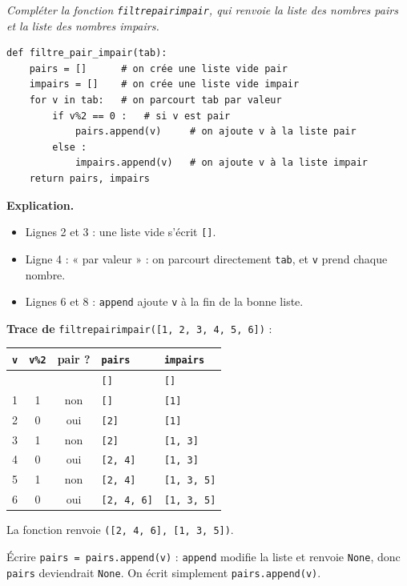 \documentclass[addpoints, 11pt]{exam}
\newcommand{\enonce}[1]{\textit{#1}\par\smallskip}
\newcommand{\explication}{\par\smallskip\noindent\textbf{Explication.}\ }
\newcommand{\code}[1]{\texttt{#1}}
\DeclareRobustCommand{\_}{\textunderscore\allowbreak}
\begin{document}
\begin{questions}
\question[3] \enonce{Compléter la fonction \code{filtre\_pair\_impair}, qui renvoie la liste des nombres pairs et la liste des nombres impairs.}
\begin{reponse}
\begin{lstlisting}
def filtre_pair_impair(tab):
    pairs = []      # on crée une liste vide pair
    impairs = []    # on crée une liste vide impair
    for v in tab:   # on parcourt tab par valeur
        if v%2 == 0 :   # si v est pair
            pairs.append(v)     # on ajoute v à la liste pair
        else :
            impairs.append(v)   # on ajoute v à la liste impair
    return pairs, impairs
\end{lstlisting}
\end{reponse}
\explication
\begin{itemize}
  \item Lignes 2 et 3 : une liste vide s'écrit \code{[]}.
  \item Ligne 4 : « par valeur » : on parcourt directement \code{tab}, et \code{v} prend chaque nombre.
  \item Lignes 6 et 8 : \code{append} ajoute \code{v} à la fin de la bonne liste.
\end{itemize}
\textbf{Trace de} \code{filtre\_pair\_impair([1, 2, 3, 4, 5, 6])} :
\begin{center}
\begin{tabular}{|c|c|c|l|l|}
\hline
\code{v} & \code{v\%2} & pair ? & \code{pairs} & \code{impairs} \\ \hline
& & & \code{[]} & \code{[]} \\
1 & 1 & non & \code{[]} & \code{[1]} \\
2 & 0 & oui & \code{[2]} & \code{[1]} \\
3 & 1 & non & \code{[2]} & \code{[1, 3]} \\
4 & 0 & oui & \code{[2, 4]} & \code{[1, 3]} \\
5 & 1 & non & \code{[2, 4]} & \code{[1, 3, 5]} \\
6 & 0 & oui & \code{[2, 4, 6]} & \code{[1, 3, 5]} \\ \hline
\end{tabular}
\end{center}
La fonction renvoie \code{([2, 4, 6], [1, 3, 5])}.
\begin{erreur}
Écrire \code{pairs = pairs.append(v)} : \code{append} modifie la liste et renvoie \code{None}, donc \code{pairs} deviendrait \code{None}. On écrit simplement \code{pairs.append(v)}.
\end{erreur}


\end{questions}
\end{document}
